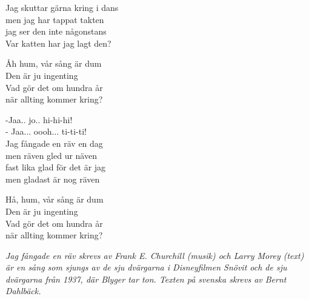 \vspace{10pt}
Jag skuttar gärna kring i dans\\
men jag har tappat takten\\
jag ser den inte någonstans\\
Var katten har jag lagt den?\par
\vspace{10pt}
Åh hum, vår sång är dum\\
Den är ju ingenting\\
Vad gör det om hundra år\\
när allting kommer kring?\par
\vspace{10pt}
-Jaa.. jo.. hi-hi-hi!\\
- Jaa... oooh... ti-ti-ti!\\
Jag fångade en räv en dag\\
men räven gled ur näven\\
fast lika glad för det är jag\\
men gladast är nog räven\par
\vspace{10pt}
Hå, hum, vår sång är dum\\
Den är ju ingenting\\
Vad gör det om hundra år\\
när allting kommer kring?\par
\vspace{10pt}
{\footnotesize\textit{Jag fångade en räv skrevs av Frank E. Churchill (musik) och Larry Morey (text) är en sång som sjungs av de sju dvärgarna i Disneyfilmen Snövit och de sju dvärgarna från 1937, där Blyger tar ton. Texten på svenska skrevs av Bernt Dahlbäck.}}
